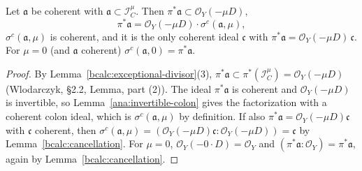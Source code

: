 \begin{lemma}
\label{bcalc:controlled-transform}
\leanok
Let \(\mathfrak a\) be coherent with \(\mathfrak a\subset\mathcal I_C^{\mu}\). Then \(\pi^*\mathfrak a\subset\mathcal O_Y(-\mu D)\),
\[
 \pi^*\mathfrak a=\mathcal O_Y(-\mu D)\cdot\sigma^{c}(\mathfrak a,\mu),
\]
\(\sigma^{c}(\mathfrak a,\mu)\) is coherent, and it is the only coherent ideal \(\mathfrak c\) with
\(\pi^*\mathfrak a=\mathcal O_Y(-\mu D)\,\mathfrak c\). For \(\mu=0\) (and \(\mathfrak a\) coherent) \(\sigma^{c}(\mathfrak a,0)=\pi^*\mathfrak a\).
\end{lemma}
\begin{proof}
\leanok
By Lemma~\ref{bcalc:exceptional-divisor}(3), \(\pi^*\mathfrak a\subset\pi^*(\mathcal I_C^{\mu})=\mathcal O_Y(-\mu D)\) (Wlodarczyk,
\S2.2, Lemma, part (2)). The ideal \(\pi^*\mathfrak a\) is coherent and \(\mathcal O_Y(-\mu D)\) is invertible, so
Lemma~\ref{ana:invertible-colon} gives the factorization with a coherent colon ideal, which is \(\sigma^{c}(\mathfrak a,\mu)\) by
definition. If also \(\pi^*\mathfrak a=\mathcal O_Y(-\mu D)\mathfrak c\) with \(\mathfrak c\) coherent, then
\(\sigma^{c}(\mathfrak a,\mu)=(\mathcal O_Y(-\mu D)\mathfrak c:\mathcal O_Y(-\mu D))=\mathfrak c\) by Lemma~\ref{bcalc:cancellation}. For
\(\mu=0\), \(\mathcal O_Y(-0\cdot D)=\mathcal O_Y\) and \((\pi^*\mathfrak a:\mathcal O_Y)=\pi^*\mathfrak a\), again by
Lemma~\ref{bcalc:cancellation}.
\end{proof}

